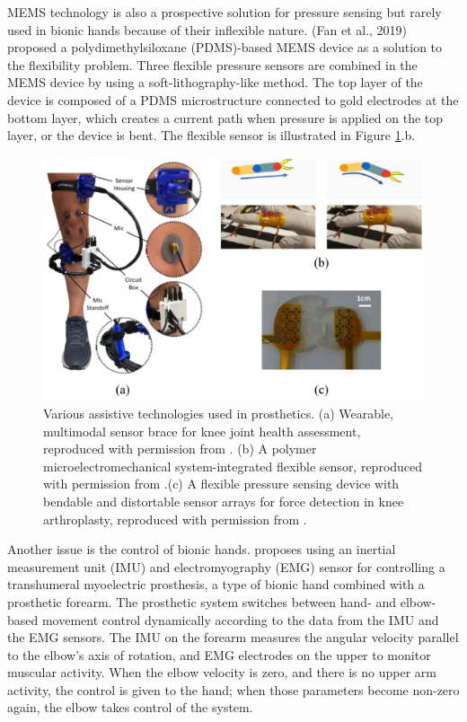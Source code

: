MEMS technology is also a prospective solution for pressure sensing but rarely used in bionic hands because of their inflexible nature. (Fan et al., 2019) proposed a polydimethylsiloxane (PDMS)-based MEMS device as a solution to the flexibility problem. Three flexible pressure sensors are combined in the MEMS device by using a soft-lithography-like method. The top layer of the device is composed of a PDMS microstructure connected to gold electrodes at the bottom layer, which creates a current path when pressure is applied on the top layer, or the device is bent. The flexible sensor is illustrated in Figure \ref{fig:Prosthetics}.b. 

\begin{figure}[h!]
    \centering
    \includegraphics[scale=1]{Figure/Prosthetics/Prosthetics.png}
    \caption{Various assistive technologies used in prosthetics. (a) Wearable, multimodal sensor brace for knee joint health assessment, reproduced with permission from \parencite{teague_wearable_2020}.
     (b) A polymer microelectromechanical system-integrated flexible sensor, reproduced with permission from \parencite{fan_polymer_2019}.(c) A flexible pressure sensing device with bendable and distortable sensor arrays for force detection in knee arthroplasty, reproduced with permission from \parencite{sun_development_2020}.}
    \label{fig:Prosthetics}
\end{figure}

Another issue is the control of bionic hands. \textcite{alshammary_synergistic_2018} proposes using an inertial measurement unit (IMU) and electromyography (EMG) sensor for controlling a transhumeral myoelectric prosthesis, a type of bionic hand combined with a prosthetic forearm. The prosthetic system switches between hand- and elbow-based movement control dynamically according to the data from the IMU and the EMG sensors. The IMU on the forearm measures the angular velocity parallel to the elbow’s axis of rotation, and EMG electrodes on the upper to monitor muscular activity. When the elbow velocity is zero, and there is no upper arm activity, the control is given to the hand; when those parameters become non-zero again, the elbow takes control of the system. 



